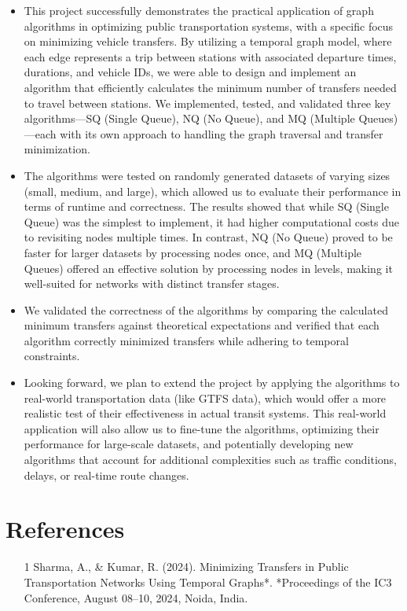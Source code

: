 \documentclass[a4paper,12pt]{article}
\begin{document}
\begin{itemize}
    \item This project successfully demonstrates the practical application of graph algorithms in optimizing public transportation systems, with a specific focus on minimizing vehicle transfers. By utilizing a temporal graph model, where each edge represents a trip between stations with associated departure times, durations, and vehicle IDs, we were able to design and implement an algorithm that efficiently calculates the minimum number of transfers needed to travel between stations. We implemented, tested, and validated three key algorithms—SQ (Single Queue), NQ (No Queue), and MQ (Multiple Queues)—each with its own approach to handling the graph traversal and transfer minimization.

    \item The algorithms were tested on randomly generated datasets of varying sizes (small, medium, and large), which allowed us to evaluate their performance in terms of runtime and correctness. The results showed that while SQ (Single Queue) was the simplest to implement, it had higher computational costs due to revisiting nodes multiple times. In contrast, NQ (No Queue) proved to be faster for larger datasets by processing nodes once, and MQ (Multiple Queues) offered an effective solution by processing nodes in levels, making it well-suited for networks with distinct transfer stages.

    \item We validated the correctness of the algorithms by comparing the calculated minimum transfers against theoretical expectations and verified that each algorithm correctly minimized transfers while adhering to temporal constraints.

    \item Looking forward, we plan to extend the project by applying the algorithms to real-world transportation data (like GTFS data), which would offer a more realistic test of their effectiveness in actual transit systems. This real-world application will also allow us to fine-tune the algorithms, optimizing their performance for large-scale datasets, and potentially developing new algorithms that account for additional complexities such as traffic conditions, delays, or real-time route changes.
\end{itemize}




\section{References}
\begin{itemize}
    \item [1] Sharma, A., \& Kumar, R. (2024). Minimizing Transfers in Public Transportation Networks Using Temporal Graphs*. *Proceedings of the IC3 Conference, August 08–10, 2024, Noida, India.
\end{itemize}
\end{document}
